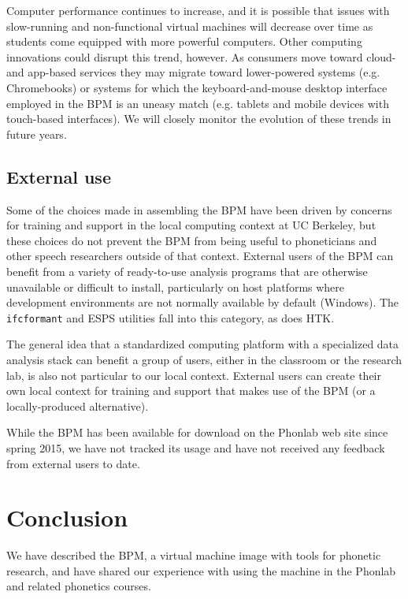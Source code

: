 \documentclass[a4paper]{article}
\begin{document}
    Computer performance continues to increase, and it is possible that issues with slow-running and non-functional virtual machines will decrease over time as students come equipped with more powerful computers. Other computing innovations could disrupt this trend, however. As consumers move toward cloud- and app-based services they may migrate toward lower-powered systems (e.g. Chromebooks) or systems for which the keyboard-and-mouse desktop interface employed in the BPM is an uneasy match (e.g. tablets and mobile devices with touch-based interfaces). We will closely monitor the evolution of these trends in future years.

    \subsection{External use}
    Some of the choices made in assembling the BPM have been driven by concerns for training and support in the local computing context at UC Berkeley, but these choices do not prevent the BPM from being useful to phoneticians and other speech researchers outside of that context. External users of the BPM can benefit from a variety of ready-to-use analysis programs that are otherwise unavailable or difficult to install, particularly on host platforms where development environments are not normally available by default (Windows). The {\tt ifcformant} and ESPS utilities fall into this category, as does HTK.

    The general idea that a standardized computing platform with a specialized data analysis stack can benefit a group of users, either in the classroom or the research lab, is also not particular to our local context. External users can create their own local context for training and support that makes use of the BPM (or a locally-produced alternative).

    While the BPM has been available for download on the Phonlab web site \cite{bpm-wiki} since spring 2015, we have not tracked its usage and have not received any feedback from external users to date.

  \section{Conclusion}
  We have described the BPM, a virtual machine image with tools for phonetic research, and have shared our experience with using the machine in the Phonlab and related phonetics courses.

  \eightpt
  
\end{document}
